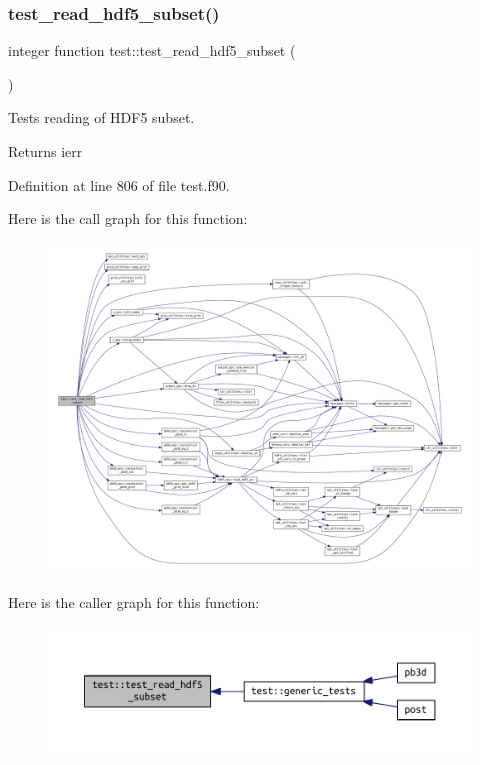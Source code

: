 \subsubsection{\texorpdfstring{test\+\_\+read\+\_\+hdf5\+\_\+subset()}{test\_read\_hdf5\_subset()}}
{\footnotesize\ttfamily integer function test\+::test\+\_\+read\+\_\+hdf5\+\_\+subset (\begin{DoxyParamCaption}{ }\end{DoxyParamCaption})}



Tests reading of H\+D\+F5 subset. 

\begin{DoxyReturn}{Returns}
ierr 
\end{DoxyReturn}


Definition at line 806 of file test.\+f90.

Here is the call graph for this function\+:\nopagebreak
\begin{figure}[H]
\begin{center}
\leavevmode
\includegraphics[width=350pt]{namespacetest_ac574f08ba400cd61070a6a6f13f6f7ee_cgraph}
\end{center}
\end{figure}
Here is the caller graph for this function\+:\nopagebreak
\begin{figure}[H]
\begin{center}
\leavevmode
\includegraphics[width=350pt]{namespacetest_ac574f08ba400cd61070a6a6f13f6f7ee_icgraph}
\end{center}
\end{figure}
\mbox{\label{namespacetest_a53c6b3d654d4577af301fe3b04473d6a}} 
